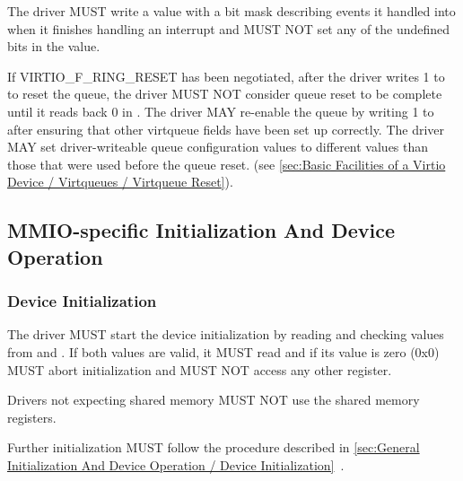 The driver MUST write a value with a bit mask describing events it handled into  when
it finishes handling an interrupt and MUST NOT set any of the undefined bits in the value.

If VIRTIO_F_RING_RESET has been negotiated, after the driver writes 1 to
 to reset the queue, the driver MUST NOT consider queue
reset to be complete until it reads back 0 in . The driver
MAY re-enable the queue by writing 1 to  after ensuring
that other virtqueue fields have been set up correctly. The driver MAY set
driver-writeable queue configuration values to different values than those
that were used before the queue reset.
(see \ref{sec:Basic Facilities of a Virtio Device / Virtqueues / Virtqueue Reset}).

\subsection{MMIO-specific Initialization And Device Operation}\label{sec:Virtio Transport Options / Virtio Over MMIO / MMIO-specific Initialization And Device Operation}

\subsubsection{Device Initialization}\label{sec:Virtio Transport Options / Virtio Over MMIO / MMIO-specific Initialization And Device Operation / Device Initialization}


The driver MUST start the device initialization by reading and
checking values from  and .
If both values are valid, it MUST read 
and if its value is zero (0x0) MUST abort initialization and
MUST NOT access any other register.

Drivers not expecting shared memory MUST NOT use the shared
memory registers.

Further initialization MUST follow the procedure described in
\ref{sec:General Initialization And Device Operation / Device Initialization}~.

